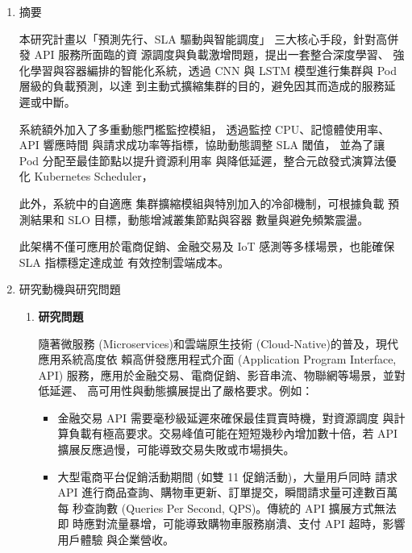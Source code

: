 \documentclass[12pt,a4paper]{article}
\begin{document}
\setlength{\parindent}{2em}


\begin{enumerate}[label={(\zhdig*)}, leftmargin=2\parindent, listparindent=\parindent]

\item 摘要

本研究計畫以「預測先行、SLA 驅動與智能調度」
三大核心手段，針對高併發 API 服務所面臨的資
源調度與負載激增問題，提出一套整合深度學習、
強化學習與容器編排的智能化系統，透過 CNN 與
LSTM 模型進行集群與 Pod 層級的負載預測，以達
到主動式擴縮集群的目的，避免因其而造成的服務延遲或中斷。

系統額外加入了多重動態門檻監控模組，
透過監控 CPU、記憶體使用率、API 響應時間
與請求成功率等指標，協助動態調整 SLA 閾值，
並為了讓 Pod 分配至最佳節點以提升資源利用率
與降低延遲，整合元啟發式演算法優化
Kubernetes Scheduler，

此外，系統中的自適應
集群擴縮模組與特別加入的冷卻機制，可根據負載
預測結果和 SLO 目標，動態增減叢集節點與容器
數量與避免頻繁震盪。

此架構不僅可應用於電商促銷、金融交易及 IoT
感測等多樣場景，也能確保 SLA 指標穩定達成並
有效控制雲端成本。

\item 研究動機與研究問題

\begin{enumerate}[label={(\arabic*)}, leftmargin=\parindent, listparindent=\parindent]

\item\textbf{研究問題}

隨著微服務 (Microservices)\cite{1}和雲端原生技術
(Cloud-Native)\cite{2}的普及，現代應用系統高度依
賴高併發應用程式介面 (Application Program Interface, API)
服務，應用於金融交易、電商促銷、影音串流、物聯網等場景，並對 低延遲、
高可用性與動態擴展提出了嚴格要求。例如：

\begin{itemize}[leftmargin=\parindent, listparindent=\parindent]

\item 金融交易 API 需要毫秒級延遲來確保最佳買賣時機，對資源調度
與計算負載有極高要求。交易峰值可能在短短幾秒內增加數十倍，若 API
擴展反應過慢，可能導致交易失敗或市場損失。\cite{3}

\item 大型電商平台促銷活動期間 (如雙 11 促銷活動)，大量用戶同時
請求API 進行商品查詢、購物車更新、訂單提交，瞬間請求量可達數百萬每
秒查詢數 (Queries Per Second, QPS)。傳統的 API 擴展方式無法即
時應對流量暴增，可能導致購物車服務崩潰、支付 API 超時，影響用戶體驗
與企業營收。\cite{4}


\end{itemize}
\end{enumerate}
\end{enumerate}
\end{document}
